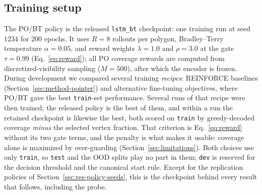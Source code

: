 \documentclass[11pt]{article}
\begin{document}
\begin{table}[!ht]
  \centering
  \footnotesize
  
  \caption{Dataset partition. The \texttt{dev} and \texttt{test} splits share the same source library files, partitioned $70/30$ by seeded random shuffle (seed $1234$): \texttt{dev} is the hyperparameter split, used to choose the decision threshold and the canonical start rule of Section~\ref{sec:limitations}, and \texttt{test} is the in-distribution held-out evaluation. Neither model's checkpoint is selected on \texttt{dev}: the policy's is selected on \texttt{train} and the probe's is simply the final epoch (Section~\ref{sec:exp-training}). The \texttt{ood} split is a larger held-out set spanning the training size range and extending well beyond it, to $n = 1000$ (about five times the training maximum); its genuinely larger-than-training polygons ($n > 198$) are analyzed separately in Section~\ref{sec:res-ood}. The \texttt{ood-large} split is used for an extreme-OOD evaluation (Table~\ref{tab:large}).}
  \label{tab:dataset_partition}
\end{table}

\subsection{Training setup}
\label{sec:exp-training}

The PO/BT policy is the released \texttt{lstm\_bt} checkpoint: one training run at seed $1234$ for $200$ epochs. It uses $R = 8$ rollouts per polygon, Bradley--Terry temperature $\alpha = 0.05$, and reward weights $\lambda = 1.0$ and $\rho = 3.0$ at the gate $\tau = 0.99$ (Eq.~\eqref{eq:reward}); all PO coverage rewards are computed from discretized-visibility sampling ($M = 500$), after which the encoder is frozen. During development we compared several training \emph{recipes}:  REINFORCE baselines (Section~\ref{sec:method-pointer}) and alternative fine-tuning objectives, where PO/BT gave the best \texttt{train}-set performance. Several runs of that recipe were then trained; the released policy is the best of them, and within a run the retained checkpoint is likewise the best, both scored on \texttt{train} by greedy-decoded coverage \emph{minus} the selected vertex fraction. That criterion is Eq.~\eqref{eq:reward} without its two gate terms, and the penalty is what makes it usable: coverage alone is maximized by over-guarding (Section~\ref{sec:limitations}). Both choices use only \texttt{train}, so \texttt{test} and the OOD splits play no part in them; \texttt{dev} is reserved for the decision threshold and the canonical start rule. Except for the replication policies of Section~\ref{sec:res-policy-seeds}, this is the checkpoint behind every result that follows, including the probe.
\end{document}
